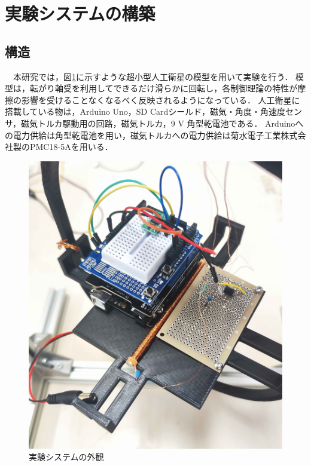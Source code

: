 \section{実験システムの構築}
\subsection{構造}
　本研究では，図\ref{fig:system}に示すような超小型人工衛星の模型を用いて実験を行う．
模型は，転がり軸受を利用してできるだけ滑らかに回転し，各制御理論の特性が摩擦の影響を受けることなくなるべく反映されるようになっている．
人工衛星に搭載している物は，Arduino Uno，SD Cardシールド，磁気・角度・角速度センサ，磁気トルカ駆動用の回路，磁気トルカ，9 V 角型乾電池である．
Arduinoへの電力供給は角型乾電池を用い，磁気トルカへの電力供給は菊水電子工業株式会社製のPMC18-5Aを用いる．

\begin{figure}[H]
	\centering
		\includegraphics[scale=0.1]{./figure/実験システム.jpg}
		\caption{実験システムの外観}
		\label{fig:system}
\end{figure}

